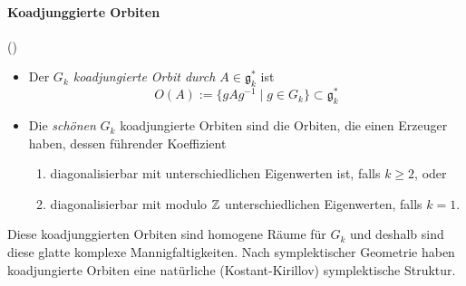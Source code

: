 \paragraph{Koadjunggierte Orbiten} (\cite[pp.23-26]{thboalch})
\begin{defn}
\begin{itemize}
\item
Der \emph{$G_k$ koadjungierte Orbit durch $A\in\mathfrak g_k^*$} ist
\[
O(A):=\{gAg^{-1}\mid g\in G_k\}\subset\mathfrak g_k^*
\]
\item
Die \emph{schönen} $G_k$ koadjungierte Orbiten sind die Orbiten, die einen
Erzeuger haben, dessen
führender Koeffizient
\begin{enumerate}
\item
diagonalisierbar mit unterschiedlichen Eigenwerten ist, falls $k\geq2$, oder
\item
diagonalisierbar mit modulo $\mathbb{Z}$ unterschiedlichen Eigenwerten, falls $k=1$.
\end{enumerate}
\end{itemize}
\end{defn}
Diese koadjunggierten Orbiten sind homogene Räume für $G_k$ und deshalb sind
diese glatte komplexe Mannigfaltigkeiten.
Nach symplektischer Geometrie haben koadjungierte Orbiten eine natürliche
(Kostant-Kirillov) symplektische Struktur.

\TODO

